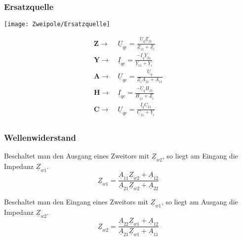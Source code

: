 \subsubsection{Ersatzquelle}
\centering\texttt{[image: Zweipole/Ersatzquelle]}
\begin{mdframed}[style=exercise]
    \begin{align*}
        \boldsymbol{Z}\rightarrow&\  \underline{U}_{qe} = \frac{\underline{U}_q\underline{Z}_{21}}{\underline{Z}_{11}+\underline{Z}_i}\\
        \boldsymbol{Y}\rightarrow&\  \underline{I}_{qe} = \frac{-\underline{I}_q\underline{Y}_{21}}{\underline{Y}_{11}+\underline{Y}_i}\\
        \boldsymbol{A}\rightarrow&\  \underline{U}_{qe} = \frac{\underline{U}_q}{\underline{Z}_i\underline{A}_{21}+\underline{A}_{11}}\\
        \boldsymbol{H}\rightarrow&\  \underline{I}_{qe} = \frac{-\underline{U}_q\underline{H}_{21}}{\underline{H}_{11}+\underline{Z}_i}\\
        \boldsymbol{C}\rightarrow&\  \underline{U}_{qe} = \frac{\underline{I}_q\underline{C}_{21}}{\underline{C}_{11}+\underline{Y}_i}\\
    \end{align*}
\end{mdframed}
\raggedright

\subsubsection{Wellenwiderstand}
Beschaltet man den Ausgang eines Zweitors mit $\underline{Z}_{w2}$, so liegt am
Eingang die Impedanz $\underline{Z}_{w1}$.
\[
    \underline{Z}_{w1} = \frac{\underline{A}_{11}\underline{Z}_{w2} + \underline{A}_{12}}{\underline{A}_{21}\underline{Z}_{w2}+\underline{A}_{22}}
\]

Beschaltet man den Eingang eines Zweitors mit $\underline{Z}_{w1}$, so liegt am
Ausgang die Impedanz $\underline{Z}_{w2}$.
\[
  \underline{Z}_{w2} = \frac{\underline{A}_{22}\underline{Z}_{w1} + \underline{A}_{12}}{\underline{A}_{21}\underline{Z}_{w1}+\underline{A}_{11}}
\]

